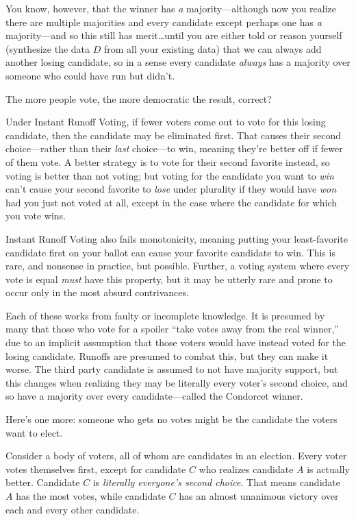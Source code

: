 You know, however, that the winner has \textit{a} majority—although now you realize there are multiple majorities and every candidate except perhaps one has \textit{a} majority—and so this still has merit…until you are either told or reason yourself (synthesize the data $D$ from all your existing data) that we can always add another losing candidate, so in a sense every candidate \textit{always} has a majority over someone who could have run but didn't.

The more people vote, the more democratic the result, correct?

Under Instant Runoff Voting, if fewer voters come out to vote for this losing candidate, then the candidate may be eliminated first.  That causes their second choice—rather than their \textit{last} choice—to win, meaning they're better off if fewer of them vote.  A better strategy is to vote for their second favorite instead, so voting is better than not voting; but voting for the candidate you want to \textit{win} can't cause your second favorite to \textit{lose} under plurality if they would have \textit{won} had you just not voted at all, except in the case where the candidate for which you vote wins.

Instant Runoff Voting also fails monotonicity, meaning putting your least-favorite candidate first on your ballot can cause your favorite candidate to win.  This is rare, and nonsense in practice, but possible.  Further, a voting system where every vote is equal \textit{must} have this property, but it may be utterly rare and prone to occur only in the most absurd contrivances.

Each of these works from faulty or incomplete knowledge.  It is presumed by many that those who vote for a spoiler ``take votes away from the real winner,'' due to an implicit assumption that those voters would have instead voted for the losing candidate.  Runoffs are presumed to combat this, but they can make it worse.  The third party candidate is assumed to not have majority support, but this changes when realizing they may be literally every voter's second choice, and so have a majority over every candidate—called the Condorcet winner.

Here's one more:  someone who gets no votes might be the candidate the voters want to elect.

Consider a body of voters, all of whom are candidates in an election.  Every voter votes themselves first, except for candidate $C$ who realizes candidate $A$ is actually better.  Candidate $C$ is \textit{literally everyone's second choice}.  That means candidate $A$ has the most votes, while candidate $C$ has an almost unanimous victory over each and every other candidate.

